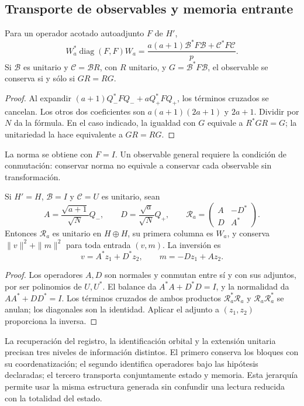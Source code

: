 \subsection{Transporte de observables y memoria entrante}
\label{subsec:acoplamiento-lectores}

\begin{theorem}
\label{thm:acoplamiento-lector}
Para un operador acotado autoadjunto \(F\) de \(H'\),
\[
 W_a^*\operatorname{diag}(F,F)W_a
 =\frac{a(a+1)\mathcal B^*F\mathcal B+\mathcal C^*F\mathcal C}{p}.
\]
Si \(\mathcal B\) es unitario y \(\mathcal C=\mathcal BR\), con
\(R\) unitario, y \(G=\mathcal B^*F\mathcal B\), el observable se
conserva si y sólo si \(GR=RG\).
\end{theorem}
\begin{proof}
Al expandir \((a+1)Q_-^*FQ_-+aQ_+^*FQ_+\), los términos cruzados
se cancelan. Los otros dos coeficientes son
\(a(a+1)(2a+1)\) y \(2a+1\). Dividir por \(N\) da la fórmula.
En el caso indicado, la igualdad con \(G\) equivale a \(R^*GR=G\);
la unitariedad la hace equivalente a \(GR=RG\).
\end{proof}

La norma se obtiene con \(F=I\). Un observable general requiere
la condición de conmutación: conservar norma no equivale a conservar
cada observable sin transformación.

\begin{theorem}
\label{thm:acoplamiento-memoria}
Si \(H'=H\), \(\mathcal B=I\) y \(\mathcal C=U\) es unitario, sean
\[
 A=\frac{\sqrt{a+1}}{\sqrt N}Q_-,\qquad
 D=\frac{\sqrt a}{\sqrt N}Q_+,\qquad
 \mathscr R_a=\begin{pmatrix}A&-D^*\\D&A^*\end{pmatrix}.
\]
Entonces \(\mathscr R_a\) es unitario en \(H\oplus H\), su primera
columna es \(W_a\), y conserva \(\|v\|^2+\|m\|^2\) para toda
entrada \((v,m)\). La inversión es
\[
 v=A^*z_1+D^*z_2,\qquad m=-Dz_1+Az_2.
\]
\end{theorem}
\begin{proof}
Los operadores \(A,D\) son normales y conmutan entre sí y con sus
adjuntos, por ser polinomios de \(U,U^*\). El balance da
\(A^*A+D^*D=I\), y la normalidad da \(AA^*+DD^*=I\).
Los términos cruzados de ambos productos
\(\mathscr R_a^*\mathscr R_a\) y \(\mathscr R_a\mathscr R_a^*\)
se anulan; los diagonales son la identidad. Aplicar el adjunto a
\((z_1,z_2)\) proporciona la inversa.
\end{proof}

La recuperación del registro, la identificación orbital y la extensión
unitaria precisan tres niveles de información distintos. El primero
conserva los bloques con su coordenatización; el segundo identifica operadores bajo
las hipótesis declaradas; el tercero transporta conjuntamente estado y
memoria. Esta jerarquía permite usar la misma estructura generada sin
confundir una lectura reducida con la totalidad del estado.

